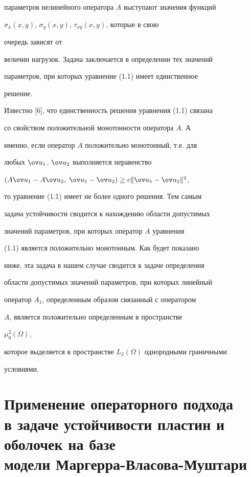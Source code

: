 параметров нелинейного оператора $A$ выступают значения функций 


$\sigma_x(x,y)$, $\sigma_y(x,y)$, $\tau_{xy}(x,y)$, которые в свою 


очередь зависят от 


величин нагрузок. Задача заключается в определении тех значений 


параметров, при которых уравнение (1.1) имеет единственное 


решение. 


 


Известно [6], что единственность решения уравнения (1.1) связана 


со свойством положительной монотонности оператора $A$. А 


именно, если оператор $A$ положительно монотонный, т.е. для 


любых $\ov u_1$, $\ov u_2$ выполняется неравенство 


$(A\ov u_1-A\ov u_2,\;\ov u_1-\ov u_2)\ge c\|\ov u_1-\ov u_2\|^2$, 


то уравнение (1.1) имеет не более одного решения. Тем самым 


задача устойчивости сводится к нахождению области допустимых 


значений параметров, при которых оператор $A$ уравнения 


(1.1) является положительно монотонным. Как будет показано 


ниже, эта задача в нашем случае сводится к задаче определения 


области допустимых значений параметров, при которых линейный 


оператор $A_1$, определенным образом связанный с оператором 


$A$, является положительно определенным в пространстве 


$\mu^2_0(\Omega)$, 


которое выделяется в пространстве $L_2(\Omega)$ однородными граничными 


условиями. 


 


\section{Применение операторного подхода\protect\\ 


в задаче устойчивости пластин и оболочек на базе\protect\\ 


модели Маргерра-Власова-Муштари} 


